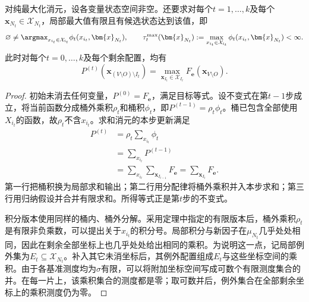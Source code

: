 \begin{theorem}[同类消元的不变式]
  对纯最大化消元，设各变量状态空间非空。还要求对每个$t=1,\ldots,k$及每个$\bm{x}_{N_t}\in\mathcal{X}_{N_t}$，局部最大值有限且有候选状态达到该值，即
  \[
    \varnothing\neq
    \argmax_{x_{i_t}\in\mathcal{X}_{i_t}}
      \phi_t(x_{i_t},\bm{x}_{N_t}),
    \qquad
    \tau_t^{\max}(\bm{x}_{N_t})
      \mathrel{:=}\max_{x_{i_t}\in\mathcal{X}_{i_t}}
        \phi_t(x_{i_t},\bm{x}_{N_t})<\infty.
  \]
  此时对每个$t=0,\ldots,k$及每个剩余配置，均有
  \[
    P^{(t)}(\bm{x}_{(V\setminus O)\setminus I_t})
    =\max_{\bm{x}_{I_t}\in\mathcal{X}_{I_t}}
       F_{\bm{e}}(\bm{x}_{V\setminus O}).
  \]
\end{theorem}

\begin{proof}
  初始未消去任何变量，$P^{(0)}=F_{\bm{e}}$，满足目标等式。设不变式在第$t-1$步成立，将当前函数分成桶外乘积$\rho_t$和桶积$\phi_t$，即$P^{(t-1)}=\rho_t\phi_t$。桶已包含全部使用$X_{i_t}$的函数，故$\rho_t$不含$x_{i_t}$。求和消元的本步更新满足
  \[
    \begin{aligned}
      P^{(t)}
      &=\rho_t\sum_{x_{i_t}}\phi_t\\
      &=\sum_{x_{i_t}}P^{(t-1)}\\
      &=\sum_{x_{i_t}}\sum_{\bm{x}_{I_{t-1}}}F_{\bm{e}}
       =\sum_{\bm{x}_{I_t}}F_{\bm{e}}.
    \end{aligned}
  \]
  第一行把桶积换为局部求和输出；第二行用分配律将桶外乘积并入本步求和；第三行用归纳假设并合并有限求和。所得等式正是第$t$步的不变式。

  积分版本使用同样的桶内、桶外分解。采用定理中指定的有限版本后，桶外乘积$\rho_t$是有限非负乘数，可以提出关于$x_{i_t}$的积分号。局部积分与新因子在$\mu_{N_t}$几乎处处相同，因此在剩余全部坐标上也几乎处处给出相同的乘积。为说明这一点，记局部例外集为$E_t\subseteq\mathcal{X}_{N_t}$。补入其它未消坐标后，其例外配置组成$E_t$与这些坐标空间的乘积。由于各基准测度均为$\sigma$有限，可以将附加坐标空间写成可数个有限测度集合的并。在每一片上，该乘积集合的测度都是零；取可数并后，例外集合在全部剩余坐标上的乘积测度仍为零。


\end{proof}
